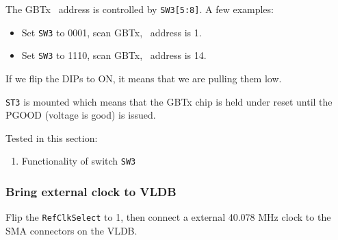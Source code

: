 The GBTx \itwoc\ address is controlled by \texttt{SW3[5:8]}. A few examples:

\begin{itemize}
    \item Set \texttt{SW3} to 0001, scan GBTx, \itwoc\ address is 1.
    \item Set \texttt{SW3} to 1110, scan GBTx, \itwoc\ address is 14.
\end{itemize}

\begin{leftbar}
    If we flip the DIPs to ON, it means that we are pulling them low.
\end{leftbar}

\begin{leftbar}
    \texttt{ST3} is mounted which means that the GBTx chip is held under reset
    until the PGOOD (voltage is good) is issued.
\end{leftbar}

Tested in this section:
\begin{enumerate}
    \item Functionality of switch \texttt{SW3}
\end{enumerate}


\subsubsection{Bring external clock to VLDB}
Flip the \texttt{RefClkSelect} to 1, then connect a external 40.078 MHz clock to
the SMA connectors on the VLDB.
